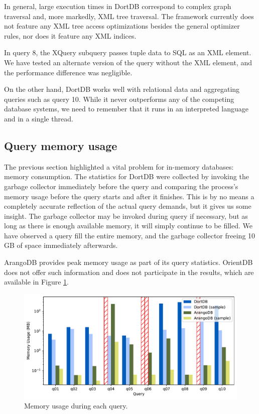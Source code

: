 In general, large execution times in DortDB correspond to complex graph traversal and, more markedly, XML tree traversal. The framework currently does not feature any XML tree access optimizations besides the general optimizer rules, nor does it feature any XML indices.

In query 8, the XQuery subquery passes tuple data to SQL as an XML element. We have tested an alternate version of the query without the XML element, and the performance difference was negligible.

On the other hand, DortDB works well with relational data and aggregating queries such as query 10. While it never outperforms any of the competing database systems, we need to remember that it runs in an interpreted language and in a single thread.

\subsection{Query memory usage}

The previous section highlighted a vital problem for in-memory databases: memory consumption. The statistics for DortDB were collected by invoking the garbage collector immediately before the query and comparing the process's memory usage before the query starts and after it finishes. This is by no means a completely accurate reflection of the actual query demands, but it gives us some insight. The garbage collector may be invoked during query if necessary, but as long as there is enough available memory, it will simply continue to be filled. We have observed a query fill the entire memory, and the garbage collector freeing 10 GB of space immediately afterwards.

ArangoDB provides peak memory usage as part of its query statistics. OrientDB does not offer such information and does not participate in the results, which are available in Figure \ref{fig:unibench-memory}.

\begin{figure}[!ht]
    \centering
    \includegraphics[width=\linewidth]{img/unibench-memory.pdf}
    \caption{Memory usage during each query.}
    \label{fig:unibench-memory}
\end{figure}

